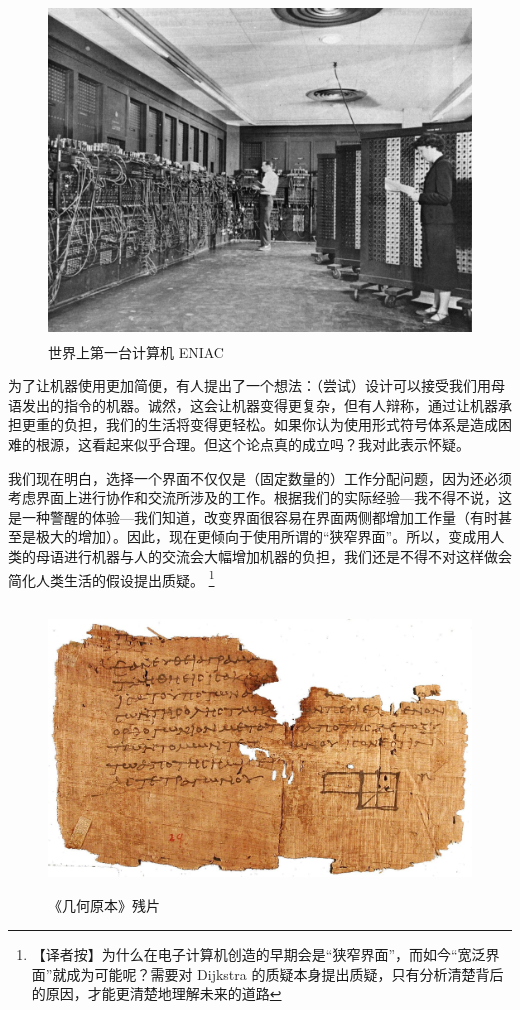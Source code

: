 \documentclass[a4paper,12pt]{article}
\begin{document}
\begin{figure}[ht]
\centering
\includegraphics[height=3.5in]{images/ENIAC.jpeg}
\caption{世界上第一台计算机 ENIAC}
\end{figure}

为了让机器使用更加简便，有人提出了一个想法：（尝试）设计可以接受我们用母语发出的指令的机器。诚然，这会让机器变得更复杂，但有人辩称，通过让机器承担更重的负担，我们的生活将变得更轻松。如果你认为使用形式符号体系是造成困难的根源，这看起来似乎合理。但这个论点真的成立吗？我对此表示怀疑。

我们现在明白，选择一个界面不仅仅是（固定数量的）工作分配问题，因为还必须考虑界面上进行协作和交流所涉及的工作。根据我们的实际经验—我不得不说，这是一种警醒的体验—我们知道，改变界面很容易在界面两侧都增加工作量（有时甚至是极大的增加）。因此，现在更倾向于使用所谓的“狭窄界面”。所以，变成用人类的母语进行机器与人的交流会大幅增加机器的负担，我们还是不得不对这样做会简化人类生活的假设提出质疑。
\footnote{【译者按】为什么在电子计算机创造的早期会是“狭窄界面”，而如今“宽泛界面”就成为可能呢？需要对 Dijkstra 的质疑本身提出质疑，只有分析清楚背后的原因，才能更清楚地理解未来的道路}

\begin{figure}[ht]
    \centering
    \includegraphics[height=3.0in]{images/elements.jpeg}
    \caption{《几何原本》残片}
\end{figure}
\end{document}
